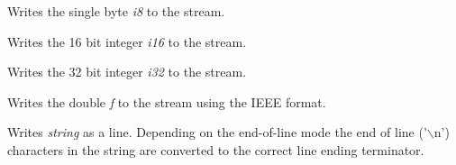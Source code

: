 Writes the single byte {\it i8} to the stream.


\label{wxtextoutputstreamwrite16}


Writes the 16 bit integer {\it i16} to the stream.


\label{wxtextoutputstreamwrite32}


Writes the 32 bit integer {\it i32} to the stream.


\label{wxtextoutputstreamwritedouble}


Writes the double {\it f} to the stream using the IEEE format.


\label{wxtextoutputstreamwritestring}


Writes {\it string} as a line. Depending on the end-of-line mode the end of
line ('$\backslash$n') characters in the string are converted to the correct
line ending terminator.


